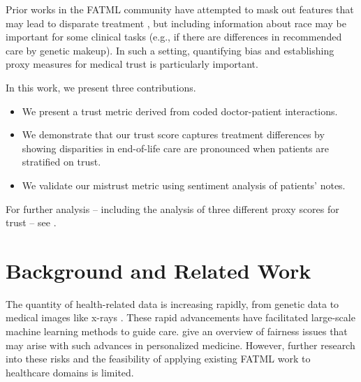 \documentclass{article}
\begin{document}
Prior works in the FATML community have attempted to mask out features that may lead to disparate treatment \citep{zemel2013learning}, but including information about race may be important for some clinical tasks (e.g., if there are differences in recommended care by genetic makeup). In such a setting, quantifying bias and establishing proxy measures for medical trust is particularly important. 

In this work, we present three contributions. 
\begin{itemize}[noitemsep,topsep=0pt,parsep=0pt,partopsep=0pt]
\item We present a trust metric derived from coded doctor-patient interactions. 
\item We demonstrate that our trust score captures treatment differences by showing disparities in end-of-life care are pronounced when patients are stratified on trust.
\item We validate our mistrust metric using sentiment analysis of patients' notes.
\end{itemize}


For further analysis -- including the analysis of three different proxy scores for trust -- see \cite{boag-eol-mistrust}.

\section{Background and Related Work}
The quantity of health-related data is increasing rapidly, from genetic data to medical images like x-rays \citep{kruse2016challenges,raghupathi2014big}. These rapid advancements have facilitated large-scale machine learning methods to guide care. \citeauthor{ferryman2018fairness} give an overview of fairness issues that may arise with such advances in personalized medicine. However, further research into these risks and the feasibility of applying existing FATML work to healthcare domains is limited. 
\end{document}
